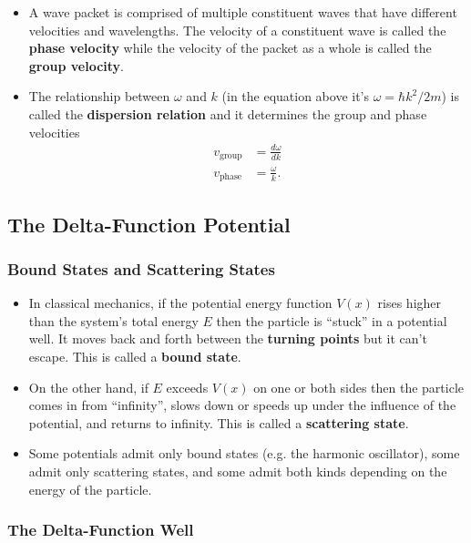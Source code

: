 \documentclass{article}
\begin{document}
\begin{itemize}
  \item A wave packet is comprised of multiple constituent waves that have different velocities and wavelengths. The velocity of a constituent wave is called the \textbf{phase velocity} while the velocity of the packet as a whole is called the \textbf{group velocity}.

  \item The relationship between $\omega$ and $k$ (in the equation above it's $\omega = \hbar k^2 / 2 m$) is called the \textbf{dispersion relation} and it determines the group and phase velocities \begin{align*}
          v_\text{group} & = \frac{d \omega}{d k} \\
          v_\text{phase} & = \frac{\omega}{k}.
        \end{align*}
\end{itemize}

\subsection{The Delta-Function Potential}

\subsubsection{Bound States and Scattering States}

\begin{itemize}
  \item In classical mechanics, if the potential energy function $V(x)$ rises higher than the system's total energy $E$ then the particle is ``stuck'' in a potential well. It moves back and forth between the \textbf{turning points} but it can't escape. This is called a \textbf{bound state}.

  \item On the other hand, if $E$ exceeds $V(x)$ on one or both sides then the particle comes in from ``infinity'', slows down or speeds up under the influence of the potential, and returns to infinity. This is called a \textbf{scattering state}.

  \item Some potentials admit only bound states (e.g. the harmonic oscillator), some admit only scattering states, and some admit both kinds depending on the energy of the particle.
\end{itemize}

\subsubsection{The Delta-Function Well}
\end{document}

